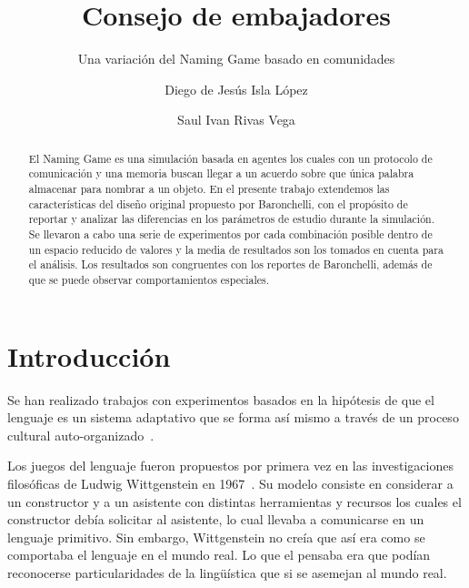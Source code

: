 \documentclass[runningheads]{llncs}
\begin{document}
%
\title{Consejo de embajadores}
\subtitle{Una variación del Naming Game basado en comunidades}
%
%
\author{Diego de Jesús Isla López \and
Saul Ivan Rivas Vega}
%
%
%
\maketitle              %
%
\begin{abstract}
El Naming Game es una simulación basada en agentes los cuales con un protocolo de comunicación y una memoria buscan llegar a un acuerdo sobre que única palabra almacenar para nombrar a un objeto. En el presente trabajo extendemos las características del diseño original propuesto por Baronchelli, con el propósito de reportar y analizar las diferencias en los parámetros de estudio durante la simulación. Se llevaron a cabo una serie de experimentos por cada combinación posible dentro de un espacio reducido de valores y la media de resultados son los tomados en cuenta para el análisis. Los resultados son congruentes con los reportes de Baronchelli, además de que se puede observar comportamientos especiales.
\end{abstract}
%
%
%
\section {Introducción}
Se han realizado trabajos con experimentos basados en la hipótesis de que el lenguaje es un sistema adaptativo que se forma así mismo a través de un proceso cultural auto-organizado~\cite{ref_article1}.

Los juegos del lenguaje fueron propuestos por primera vez en las investigaciones filosóficas de Ludwig Wittgenstein en 1967~\cite{ref_article1}. Su modelo consiste en considerar a un constructor y a un asistente con distintas herramientas y recursos los cuales el constructor debía solicitar al asistente, lo cual llevaba a comunicarse en un lenguaje primitivo. Sin embargo, Wittgenstein no creía que así era como se comportaba el lenguaje en el mundo real. Lo que el pensaba era que podían reconocerse particularidades de la lingüística que si se asemejan al mundo real.
\end{document}

